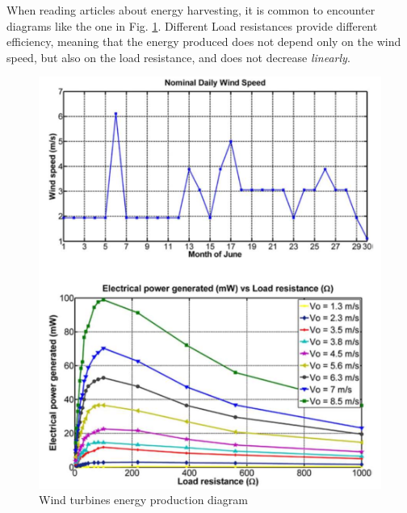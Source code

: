 \begin{paracol}{2}
   When reading articles about energy harvesting, it is common to encounter diagrams like the one in Fig. \ref{fig:windturbines}. 
   Different Load resistances provide different efficiency, meaning that the energy produced does not depend only on the wind speed, but also on the load resistance, and does not decrease \textit{linearly}.
   \switchcolumn
   \begin{figure}[htbp]
      \centering
      \includegraphics{images/windturbines.png}
      \caption{Wind turbines energy production diagram}
      \label{fig:windturbines}
   \end{figure}
\end{paracol}